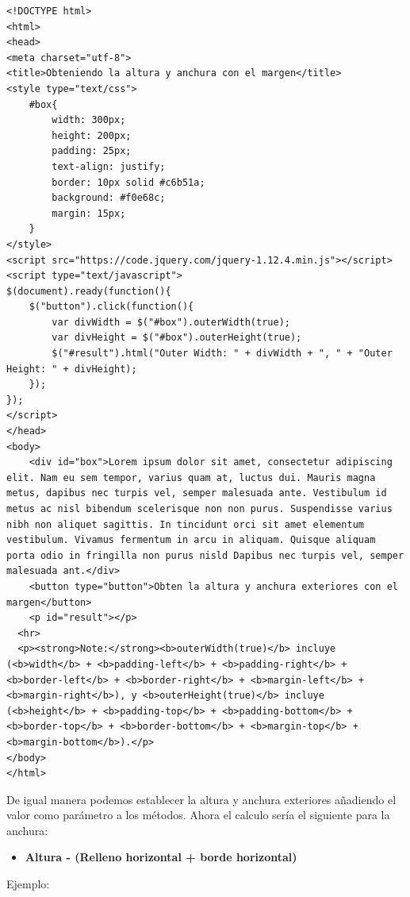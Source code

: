 \documentclass[11pt]{article}
\begin{document}
\begin{verbatim}
<!DOCTYPE html>
<html>
<head>
<meta charset="utf-8">
<title>Obteniendo la altura y anchura con el margen</title>
<style type="text/css">
    #box{
        width: 300px;
        height: 200px;
        padding: 25px;
        text-align: justify;
        border: 10px solid #c6b51a;
        background: #f0e68c;
        margin: 15px;
    }        
</style>
<script src="https://code.jquery.com/jquery-1.12.4.min.js"></script>
<script type="text/javascript">
$(document).ready(function(){
    $("button").click(function(){
        var divWidth = $("#box").outerWidth(true);
        var divHeight = $("#box").outerHeight(true);
        $("#result").html("Outer Width: " + divWidth + ", " + "Outer Height: " + divHeight);
    });
});
</script>
</head>
<body>
    <div id="box">Lorem ipsum dolor sit amet, consectetur adipiscing elit. Nam eu sem tempor, varius quam at, luctus dui. Mauris magna metus, dapibus nec turpis vel, semper malesuada ante. Vestibulum id metus ac nisl bibendum scelerisque non non purus. Suspendisse varius nibh non aliquet sagittis. In tincidunt orci sit amet elementum vestibulum. Vivamus fermentum in arcu in aliquam. Quisque aliquam porta odio in fringilla non purus nisld Dapibus nec turpis vel, semper malesuada ant.</div>
    <button type="button">Obten la altura y anchura exteriores con el margen</button>
    <p id="result"></p>
  <hr>
  <p><strong>Note:</strong><b>outerWidth(true)</b> incluye (<b>width</b> + <b>padding-left</b> + <b>padding-right</b> + <b>border-left</b> + <b>border-right</b> + <b>margin-left</b> + <b>margin-right</b>), y <b>outerHeight(true)</b> incluye (<b>height</b> + <b>padding-top</b> + <b>padding-bottom</b> + <b>border-top</b> + <b>border-bottom</b> + <b>margin-top</b> + <b>margin-bottom</b>).</p>
</body>
</html>                                		
\end{verbatim}

De igual manera podemos establecer la altura y anchura exteriores añadiendo el valor como parámetro a los métodos. Ahora el calculo sería el siguiente para la anchura: 

\begin{itemize}
\item \textbf{Altura - (Relleno horizontal + borde horizontal)}
\end{itemize}

Ejemplo:
\end{document}
